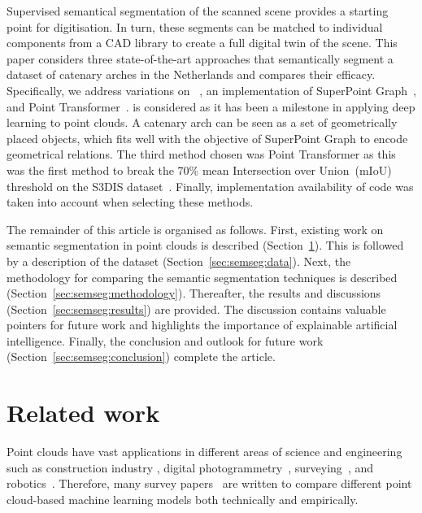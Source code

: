 Supervised semantical segmentation of the scanned scene provides a starting point for digitisation.
In turn, these segments can be matched to individual components from a CAD library to create a full digital twin of the scene.
This paper considers three state-of-the-art approaches that semantically segment a dataset of catenary arches in the Netherlands and compares their efficacy.
Specifically, we address variations on \pnpp{}~\cite{Qi.17.2}, an implementation of SuperPoint Graph~\cite{Landrieu18}, and Point Transformer~\cite{Zhao.20}. 
\pnpp{} is considered as it has been a milestone in applying deep learning to point clouds. A catenary arch can be seen as a set of geometrically placed objects, which fits well with the objective of SuperPoint Graph to encode geometrical relations. The third method chosen was Point Transformer as this was the first method to break the 70\% mean Intersection over Union~(mIoU) threshold on the S3DIS dataset~\cite{armeni.16}.
Finally, implementation availability of code was taken into account when selecting these methods.

The remainder of this article is organised as follows.
First, existing work on semantic segmentation in point clouds is described (Section~\ref{sec:semseg:related}).
This is followed by a description of the dataset (Section~\ref{sec:semseg:data}).
Next, the methodology for comparing the semantic segmentation techniques is described (Section~\ref{sec:semseg:methodology}).
Thereafter, the results and discussions (Section~\ref{sec:semseg:results}) are provided. The discussion contains valuable pointers for future work and highlights the importance of explainable artificial intelligence. 
Finally, the conclusion and outlook for future work (Section~\ref{sec:semseg:conclusion}) complete the article.

\section{Related work}\label{sec:semseg:related}
Point clouds have vast applications in different areas of science and engineering such as construction industry \cite{wang2019Applications}, digital photogrammetry~\cite{callahan2012close}, surveying~\cite{valero2018automatic}, and robotics~\cite{mahler2019learning}. Therefore, many survey papers~\cite{bello2020deep,burume2021deep,guo2020deep,liu19deep,liu2021deep,zhang2019review} are written to compare different point cloud-based machine learning models both technically and empirically.

